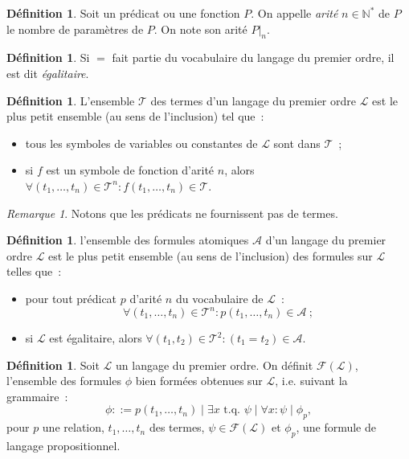 \documentclass{article}
\theoremstyle{definition}
\newtheorem{déf}[thm]{Définition}
\theoremstyle{remark}
\newtheorem*{rmq}{Remarque}
\newcommand{\N}{\mathbb N}
\newcommand{\tq}{\text{ t.q. }}
\begin{document}
	\begin{déf} Soit un prédicat ou une fonction $P$. On appelle \textit{arité} $n \in \N^*$ de $P$ le nombre de paramètres de $P$. On note son arité $P|_n$.
	\end{déf}

	\begin{déf} Si $=$ fait partie du vocabulaire du langage du premier ordre, il est dit \textit{égalitaire}.
	\end{déf}

	\begin{déf} L'ensemble $\mathcal T$ des termes d'un langage du premier ordre $\mathcal L$ est le plus petit ensemble (au sens de l'inclusion) tel que~:
	\begin{itemize}
		\item tous les symboles de variables ou constantes de $\mathcal L$ sont dans $\mathcal T$~;
		\item si $f$ est un symbole de fonction d'arité $n$, alors $\forall (t_1, \ldots, t_n) \in \mathcal T^n : f(t_1, \ldots, t_n) \in \mathcal T$.
	\end{itemize}
	\end{déf}

	\begin{rmq} Notons que les prédicats ne fournissent pas de termes.
	\end{rmq}

	\begin{déf} l'ensemble des formules atomiques $\mathcal A$ d'un langage du premier ordre $\mathcal L$ est le plus petit ensemble (au sens de l'inclusion)
	des formules sur $\mathcal L$ telles que~:
	\begin{itemize}
		\item pour tout prédicat $p$ d'arité $n$ du vocabulaire de $\mathcal L$~:
		\[\forall (t_1, \ldots, t_n) \in \mathcal T^n : p(t_1, \ldots, t_n) \in \mathcal A~;\]
		\item si $\mathcal L$ est égalitaire, alors $\forall (t_1, t_2) \in \mathcal T^2 : (t_1=t_2) \in \mathcal A$.
	\end{itemize}
	\end{déf}

	\begin{déf} Soit $\mathcal L$ un langage du premier ordre. On définit $\mathcal F(\mathcal L)$, l'ensemble des formules $\phi$ bien formées
	obtenues sur $\mathcal L$, i.e. suivant la grammaire~:
	\[\phi ::= p(t_1, \ldots, t_n) \mid \exists x \tq \psi \mid \forall x : \psi \mid \phi_p,\]
	pour $p$ une relation, $t_1, \ldots, t_n$ des termes, $\psi \in \mathcal F(\mathcal L)$ et $\phi_p$, une formule de langage propositionnel.
	\end{déf}
\end{document}
